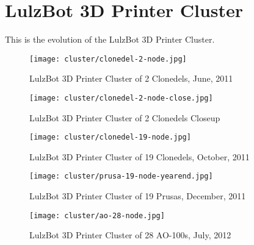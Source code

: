 %
%
%
%
%

\section{LulzBot 3D Printer Cluster}
This is the evolution of the LulzBot 3D Printer Cluster.

\begin{figure}[h!]
\texttt{[image: cluster/clonedel-2-node.jpg]}
 \caption{LulzBot 3D Printer Cluster of 2 Clonedels, June, 2011}
 \label{fig:clonedel-2-node}
\end{figure}

\begin{figure}[h!]
\texttt{[image: cluster/clonedel-2-node-close.jpg]}
 \caption{LulzBot 3D Printer Cluster of 2 Clonedels Closeup}
 \label{fig:clonedel-2-node-close}
\end{figure}

\begin{figure}[h!]
\texttt{[image: cluster/clonedel-19-node.jpg]}
 \caption{LulzBot 3D Printer Cluster of 19 Clonedels, October, 2011}
 \label{fig:clonedel-20-node}
\end{figure}

\begin{figure}[h!]
\texttt{[image: cluster/prusa-19-node-yearend.jpg]}
 \caption{LulzBot 3D Printer Cluster of 19 Prusas, December, 2011}
 \label{fig:prusa-19-node-yearend}
\end{figure}

\begin{figure}[h!]
\texttt{[image: cluster/ao-28-node.jpg]}
 \caption{LulzBot 3D Printer Cluster of 28 AO-100s, July, 2012}
 \label{fig:ao-28-node}
\end{figure}

